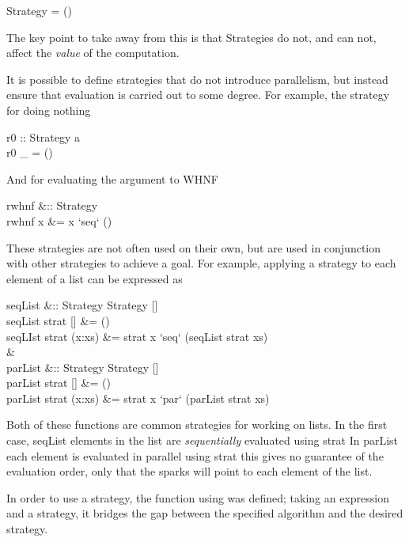 \begin{haskell}
 Strategy \hasalpha = \hasalpha \to ()
\end{haskell}

The key point to take away from this is that Strategies do not, and can not,
affect the \emph{value} of the computation.

It is possible to define strategies that do not introduce parallelism, but
instead ensure that evaluation is carried out to some degree.  For example, the
strategy for doing nothing

\begin{haskell}
r0 :: Strategy a\\
r0 \_ = ()
\end{haskell}

And for evaluating the argument to WHNF

\begin{haskell}
rwhnf   &:: Strategy \hasalpha\\
rwhnf x &= x `seq` ()
\end{haskell}

These strategies are not often used on their own, but are used in conjunction
with other strategies to achieve a goal. For example, applying a strategy to
each element of a list can be expressed as

\begin{haskell}
seqList &:: Strategy \hasalpha \to Strategy [\hasalpha]\\
seqList strat [] &= ()\\
seqLIst strat (x:xs) &= strat x `seq` (seqList strat xs)\\
\quad&\quad \\
parList &:: Strategy \hasalpha \to Strategy [\hasalpha] \\
parList strat [] &= () \\
parList strat (x:xs) &= strat x `par` (parList strat xs)
\end{haskell}

Both of these functions are common strategies for working on lists. In the first
case, \<seqList\> elements in the list are \emph{sequentially} evaluated
using \<strat\> In \<parList\> each element is evaluated in parallel
using \<strat\> this gives no guarantee of the evaluation order, only that
the sparks will point to each element of the list.

In order to use a strategy, the function \<using\> was defined; taking an
expression and a strategy, it bridges the gap between the specified algorithm
and the desired strategy.


